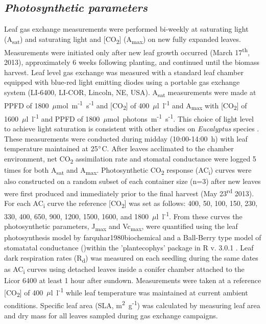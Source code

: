 \documentclass[a4paper]{article}\usepackage[]{graphicx}\usepackage[]{color}
\begin{document}
\subsection*{\textit{Photosynthetic parameters}}
Leaf gas exchange measurements were performed bi-weekly at saturating light (A\textsubscript{sat}) and saturating light and [CO\textsubscript{2}] (A\textsubscript{max}) on new fully expanded leaves. Measurements were initiated only after new leaf growth occurred (March 17\textsuperscript{th}, 2013), approximately 6 weeks following planting, and continued until the biomass harvest. Leaf level gas exchange was measured with a standard leaf chamber equipped with blue-red light emitting diodes using a portable gas exchange system (LI-6400, LI-COR, Lincoln, NE, USA). A\textsubscript{sat} measurements were made at PPFD of 1800~$\mu$mol~m\textsuperscript{-1}~s\textsuperscript{-1} and [CO\textsubscript{2}] of 400~$\mu$l~l\textsuperscript{-1} and A\textsubscript{max} with [CO\textsubscript{2}] of 1600~$\mu$l~l\textsuperscript{-1} and PPFD of 1800~$\mu$mol~photons~m\textsuperscript{-1}~s\textsuperscript{-1}. This choice of light level to achieve light saturation is consistent with other studies on \textit{Eucalyptus} species \citep{kallarackal1997ecophysiological,pinkard1998photosynthetic,crous2013photosynthesis,drake2014capacity}. These measurements were conducted during midday (10:00-14:00~h) with leaf temperature maintained at 25$\degree$C. After leaves acclimated to the chamber environment, net CO\textsubscript{2} assimilation rate and stomatal conductance were logged 5 times for both A\textsubscript{sat} and A\textsubscript{max}. Photosynthetic CO\textsubscript{2} response (AC\textsubscript{i}) curves were also constructed on a random subset of each container size (n=3) after new leaves were first produced and immediately prior to the final harvest (May 23\textsuperscript{rd} 2013). For each AC\textsubscript{i} curve the reference [CO\textsubscript{2}] was set as follows:  400, 50, 100, 150, 230, 330, 400, 650, 900, 1200, 1500, 1600, and 1800~$\mu$l~l\textsuperscript{-1}. From these curves the photosynthetic parameters, J\textsubscript{max} and Vc\textsubscript{max}, were quantified using the leaf photosynthesis model by farquhar1980biochemical and a Ball-Berry type model of stomatatal conductance ()within the 'plantecophys' package in R v. 3.0.1 \citep{plantecophys,RDevelopmentCoreTeam2011}.  Leaf dark respiration rates (R\textsubscript{d}) was measured on each seedling during the same dates as AC\textsubscript{i} curves using detached leaves inside a conifer chamber attached to the Licor 6400 at least 1 hour after sundown.   Measurements were taken at a reference [CO\textsubscript{2}] of 400~$\mu$l~l\textsuperscript{-1} while leaf temperature was maintained at current ambient conditions. Specific leaf area (SLA, m\textsuperscript{2}~g\textsuperscript{-1}) was calculated by measuring leaf area and dry mass for all leaves sampled during gas exchange campaigns.
\end{document}
